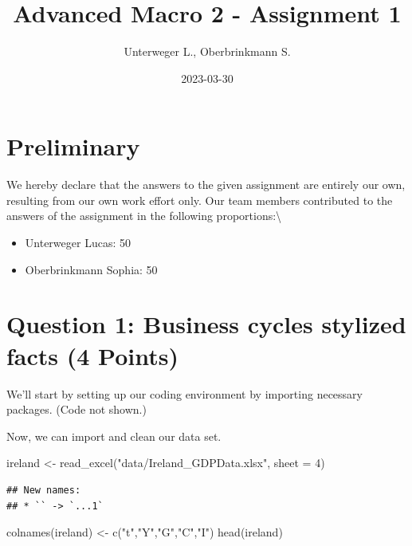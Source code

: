 \documentclass[
]{article}
\title{Advanced Macro 2 - Assignment 1}
\author{Unterweger L., Oberbrinkmann S.}
\date{2023-03-30}
\newenvironment{Shaded}{\begin{snugshade}}{\end{snugshade}}
\newcommand{\AttributeTok}[1]{\textcolor[rgb]{0.77,0.63,0.00}{#1}}
\newcommand{\DecValTok}[1]{\textcolor[rgb]{0.00,0.00,0.81}{#1}}
\newcommand{\FunctionTok}[1]{\textcolor[rgb]{0.00,0.00,0.00}{#1}}
\newcommand{\NormalTok}[1]{#1}
\newcommand{\OtherTok}[1]{\textcolor[rgb]{0.56,0.35,0.01}{#1}}
\newcommand{\StringTok}[1]{\textcolor[rgb]{0.31,0.60,0.02}{#1}}
\begin{document}
\maketitle

\hypertarget{preliminary}{%
\section{Preliminary}\label{preliminary}}

We hereby declare that the answers to the given assignment are entirely
our own, resulting from our own work effort only. Our team members
contributed to the answers of the assignment in the following
proportions:\textbackslash{}

\begin{itemize}
  \item Unterweger Lucas: 50%
  \item Oberbrinkmann Sophia: 50%
\end{itemize}

\hypertarget{question-1-business-cycles-stylized-facts-4-points}{%
\section{Question 1: Business cycles stylized facts (4
Points)}\label{question-1-business-cycles-stylized-facts-4-points}}

We'll start by setting up our coding environment by importing necessary
packages. (Code not shown.)

Now, we can import and clean our data set.

\begin{Shaded}
\begin{Highlighting}[]
\NormalTok{ireland }\OtherTok{\textless{}{-}} \FunctionTok{read\_excel}\NormalTok{(}\StringTok{"data/Ireland\_GDPData.xlsx"}\NormalTok{, }\AttributeTok{sheet =} \DecValTok{4}\NormalTok{)}
\end{Highlighting}
\end{Shaded}

\begin{verbatim}
## New names:
## * `` -> `...1`
\end{verbatim}

\begin{Shaded}
\begin{Highlighting}[]
\FunctionTok{colnames}\NormalTok{(ireland) }\OtherTok{\textless{}{-}} \FunctionTok{c}\NormalTok{(}\StringTok{"t"}\NormalTok{,}\StringTok{"Y"}\NormalTok{,}\StringTok{"G"}\NormalTok{,}\StringTok{"C"}\NormalTok{,}\StringTok{"I"}\NormalTok{)}
\FunctionTok{head}\NormalTok{(ireland)}
\end{Highlighting}
\end{Shaded}
\end{document}
